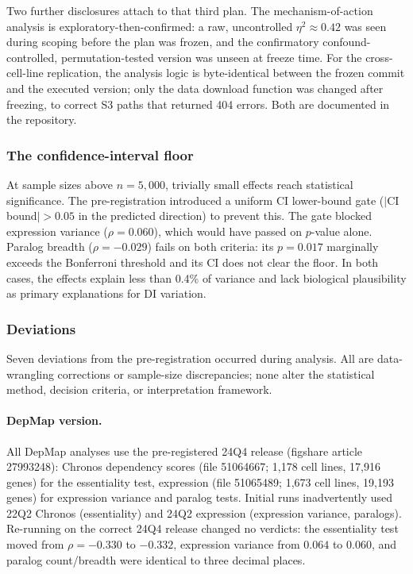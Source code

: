 \documentclass[11pt]{article}
\begin{document}
Two further disclosures attach to that third plan.  The mechanism-of-action
analysis is exploratory-then-confirmed: a raw, uncontrolled $\eta^2 \approx
0.42$ was seen during scoping before the plan was frozen, and the confirmatory
confound-controlled, permutation-tested version was unseen at freeze time.  For
the cross-cell-line replication, the analysis logic is byte-identical between
the frozen commit and the executed version; only the data download function was
changed after freezing, to correct S3 paths that returned 404 errors.  Both are
documented in the repository.

\subsubsection*{The confidence-interval floor}

At sample sizes above $n = 5{,}000$, trivially small effects reach
statistical significance.  The pre-registration introduced a uniform
CI lower-bound gate ($|$CI bound$| > 0.05$ in the predicted direction)
to prevent this.  The gate blocked expression variance
($\rho = 0.060$), which would have passed on $p$-value alone.
Paralog breadth ($\rho = -0.029$) fails on both criteria: its
$p = 0.017$ marginally exceeds the Bonferroni threshold and its CI
does not clear the floor.  In both cases, the effects explain less than
0.4\% of variance and lack biological plausibility as primary
explanations for DI variation.

\subsubsection*{Deviations}

Seven deviations from the pre-registration occurred during analysis.
All are data-wrangling corrections or sample-size discrepancies; none
alter the statistical method, decision criteria, or interpretation
framework.

\paragraph{DepMap version.}
All DepMap analyses use the pre-registered 24Q4 release (figshare
article 27993248): Chronos dependency scores (file 51064667; 1{,}178
cell lines, 17{,}916 genes) for the essentiality test, expression
(file 51065489; 1{,}673 cell lines, 19{,}193 genes) for expression
variance and paralog tests.
Initial runs inadvertently used 22Q2 Chronos (essentiality) and 24Q2
expression (expression variance, paralogs).  Re-running on the correct 24Q4 release changed no
verdicts: the essentiality test moved from $\rho = -0.330$ to $-0.332$,
expression variance from $0.064$ to $0.060$, and paralog count/breadth
were identical to three decimal places.
\end{document}
